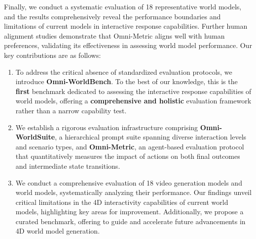 Finally, we conduct a systematic evaluation of 18 representative world models, and the results comprehensively reveal the performance boundaries and limitations of current models in interactive response capabilities.
Further human alignment studies demonstrate that Omni-Metric  aligns well with human preferences, validating its effectiveness in assessing world model performance.
Our key contributions are as follows: 
\begin{enumerate}
\item To address the critical absence of standardized evaluation protocols, we introduce \textbf{Omni-WorldBench}. To the best of our knowledge, this is the \textbf{first} benchmark dedicated to assessing the interactive response capabilities of world models, offering a \textbf{comprehensive and holistic} evaluation framework rather than a narrow capability test.
\item We establish a rigorous evaluation infrastructure comprising \textbf{Omni-WorldSuite}, a hierarchical prompt suite spanning diverse interaction levels and scenario types, and \textbf{Omni-Metric}, an agent-based evaluation protocol that quantitatively measures the impact of actions on both final outcomes and intermediate state transitions.
\item We conduct a comprehensive evaluation of 18 video generation models and world models, systematically analyzing their performance. Our findings unveil critical limitations in the 4D interactivity capabilities of current world models, highlighting key areas for improvement. Additionally, we propose a curated benchmark, offering to guide and accelerate future advancements in 4D world model generation.
\end{enumerate}


